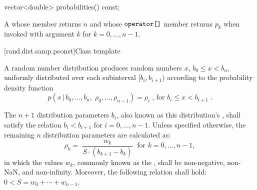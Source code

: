 %
%
\begin{itemdecl}
vector<double> probabilities() const;
\end{itemdecl}

\begin{itemdescr}
\pnum\returns A 
 whose  member returns $n$
 and whose $ \texttt{operator[]} $ member returns $p_k$
 when invoked with argument $k$ for $k = 0, \ldots, n\!-\!1 $.
\end{itemdescr}



[rand.dist.samp.pconst]{Class template }%
%

\pnum
A  random number distribution
produces random numbers $x$,
$ b_0 \leq x < b_n $,
uniformly distributed over each subinterval
$ [ b_i, b_{i+1} ) $
according to the probability density function
%
\[%
 p(x\,|\,b_0,\ldots,b_n,\;\rho_0,\ldots,\rho_{n-1})
      = \rho_i
\; \mbox{,}
\mbox{ for } b_i \le x < b_{i+1}
\; \mbox{.}
\]

\pnum
The $n+1$ distribution parameters $b_i$,
also known as this distribution's %
%
%
, shall satisfy the relation
 $ b_i < b_{i+1} $
for $i = 0, \ldots, n\!-\!1 $.
Unless specified otherwise,
the remaining $n$ distribution parameters are calculated as:
\[%
 \rho_k = \;
   \frac{w_k}{S \cdot (b_{k+1}-b_k)}
   \; \mbox{ for } k = 0, \ldots, n\!-\!1,
\]
in which the values $w_k$,
commonly known as the %
%
%
, shall be non-negative, non-NaN, and non-infinity.
Moreover, the following relation shall hold:
 $ 0 < S = w_0 + \cdots + w_{n-1} $.


